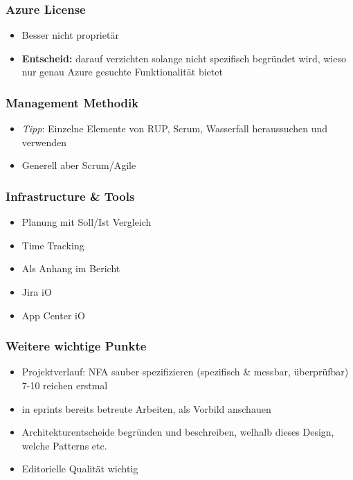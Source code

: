 \hypertarget{azure-license}{%
\subsubsection*{Azure License}\label{azure-license}}

\begin{itemize}

\item
  Besser nicht proprietär
\item
  \textbf{Entscheid:} darauf verzichten solange nicht spezifisch
  begründet wird, wieso nur genau Azure gesuchte Funktionalität bietet
\end{itemize}

\hypertarget{management-methodik}{%
\subsubsection*{Management Methodik}\label{management-methodik}}

\begin{itemize}

\item
  \emph{Tipp}: Einzelne Elemente von RUP, Scrum, Wasserfall heraussuchen
  und verwenden
\item
  Generell aber Scrum/Agile
\end{itemize}

\hypertarget{infrastructure-ux5cux26-tools}{%
\subsubsection*{Infrastructure \&
Tools}\label{infrastructure-ux5cux26-tools}}

\begin{itemize}

\item
  Planung mit Soll/Ist Vergleich
\item
  Time Tracking
\item
  Als Anhang im Bericht
\item
  Jira iO
\item
  App Center iO
\end{itemize}

\hypertarget{weitere-wichtige-punkte}{%
\subsubsection*{Weitere wichtige Punkte}\label{weitere-wichtige-punkte}}

\begin{itemize}

\item
  Projektverlauf: NFA sauber spezifizieren (spezifisch \& messbar,
  überprüfbar) 7-10 reichen erstmal
\item
  in eprints bereits betreute Arbeiten, als Vorbild anschauen
\item
  Architekturentscheide begründen und beschreiben, welhalb dieses
  Design, welche Patterns etc.
\item
  Editorielle Qualität wichtig
\end{itemize}

